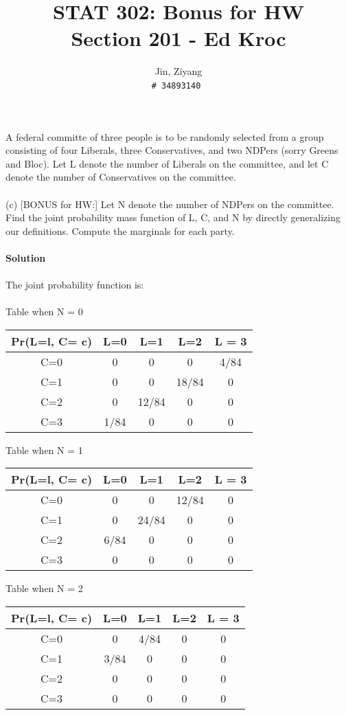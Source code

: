\documentclass{article}
\title{STAT 302: Bonus for HW\\
Section 201 - Ed Kroc}
\author{
	Jin, Ziyang\\
	\texttt{\# 34893140}\
}
\begin{document}
	\maketitle

\noindent A federal committe of three people is to be randomly selected from a group consisting of four Liberals, three Conservatives, and two NDPers (sorry Greens and Bloc). Let L denote the number of Liberals on the committee, and let C denote the number of Conservatives on the committee.\\
\\
(c) [BONUS for HW:] Let N denote the number of NDPers on the committee. Find the joint probability mass function of L, C, and N by directly generalizing our definitions. Compute the marginals for each party.\\
\\
\textbf{Solution}\\
\\
The joint probability function is:\\
\\
Table when N = 0
\begin{center}
 \begin{tabular}{|| c c c c c ||} 
 \hline
 Pr(L=l, C= c) & L=0 & L=1 & L=2 & L = 3\\ [0.5ex] 
 \hline\hline
 C=0 & 0 & 0 & 0 & 4/84 \\ 
 \hline
 C=1 & 0 & 0 & 18/84 & 0 \\
 \hline
 C=2 & 0 & 12/84 & 0 & 0 \\
 \hline
 C=3 & 1/84 & 0 & 0 & 0 \\
 \hline
\end{tabular}
\end{center}
Table when N = 1
\begin{center}
 \begin{tabular}{|| c c c c c ||} 
 \hline
 Pr(L=l, C= c) & L=0 & L=1 & L=2 & L = 3\\ [0.5ex] 
 \hline\hline
 C=0 & 0 & 0 & 12/84 & 0 \\ 
 \hline
 C=1 & 0 & 24/84 & 0 & 0 \\
 \hline
 C=2 & 6/84 & 0 & 0 & 0 \\
 \hline
 C=3 & 0 & 0 & 0 & 0 \\
 \hline
\end{tabular}
\end{center}
Table when N = 2
\begin{center}
 \begin{tabular}{|| c c c c c ||} 
 \hline
 Pr(L=l, C= c) & L=0 & L=1 & L=2 & L = 3\\ [0.5ex] 
 \hline\hline
 C=0 & 0 & 4/84 & 0 & 0 \\ 
 \hline
 C=1 & 3/84 & 0 & 0 & 0 \\
 \hline
 C=2 & 0 & 0 & 0 & 0 \\
 \hline
 C=3 & 0 & 0 & 0 & 0 \\
 \hline
\end{tabular}
\end{center}
\end{document}
